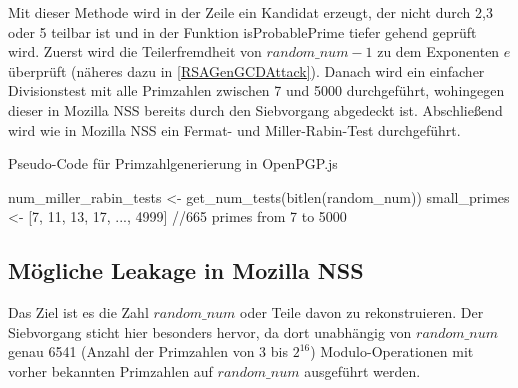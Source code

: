 Mit dieser Methode wird in der Zeile ein Kandidat erzeugt, der nicht durch 2,3 oder 5 teilbar ist und in der Funktion isProbablePrime tiefer gehend geprüft wird.
Zuerst wird die Teilerfremdheit von $random\_num -1$ zu dem Exponenten $e$ überprüft (näheres dazu in \ref{RSAGenGCDAttack}).
Danach wird ein einfacher Divisionstest mit alle Primzahlen zwischen 7 und 5000 durchgeführt, wohingegen dieser in Mozilla NSS bereits durch den Siebvorgang abgedeckt ist.
Abschließend wird wie in Mozilla NSS ein Fermat- und Miller-Rabin-Test durchgeführt.

\begin{algorithm}[h]
\DontPrintSemicolon
\caption{Pseudo-Code für Primzahlgenerierung in OpenPGP.js}
\label{alg:randomProbablePrimeOpenPGPjs}
num_miller_rabin_tests <- get_num_tests(bitlen(random\_num))\;
small\_primes <- [7, 11, 13, 17, ..., 4999] //665 primes from 7 to 5000\;


\end{algorithm}

\subsection{Mögliche Leakage in Mozilla NSS}
\label{leakageMozillaNSS}

Das Ziel ist es die Zahl $random\_num$ oder Teile davon zu rekonstruieren.
Der Siebvorgang sticht hier besonders hervor, da dort unabhängig von $random\_num$ genau 6541 (Anzahl der Primzahlen von 3 bis $2^{16}$) Modulo-Operationen mit vorher bekannten Primzahlen auf $random\_num$ ausgeführt werden.

